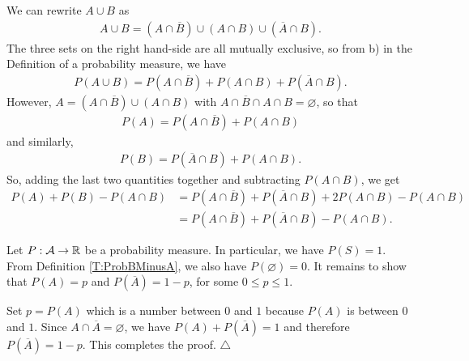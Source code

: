 	\begin{problem}
	We can rewrite $A \cup B$ as
		\begin{align*}
		A \cup B = (A \cap \overline{B}) \cup (A \cap B) \cup (\overline{A} \cap B ) .
		\end{align*}
	The three sets on the right hand-side are all mutually exclusive, so from b) in the Definition of a probability measure, we have
		\begin{align*}
		P (A \cup B) = P(A \cap \overline{B}) + P (A\cap B) + P (\overline{A} \cap B ) .
		\end{align*}
	However, $A = (A \cap \overline{B}) \cup (A \cap B)$ with $A \cap \overline{B} \cap A \cap B = \varnothing$, so that
		\begin{align*}
		P (A) = P (A \cap \overline{B}) + P (A \cap B)
		\end{align*}
	and similarly,
		\begin{align*}
		P (B) = P (\overline{A} \cap B) + P (A \cap B) .
		\end{align*}
	So, adding the last two quantities together and subtracting $P (A \cap B)$, we get
		\begin{align*}
		P (A) + P (B) - P (A \cap B) & = P (A \cap \overline{B}) + P (\overline{A} \cap B) + 2 P (A \cap B) - P (A \cap B) \\
		&= P (A \cap \overline{B}) + P (\overline{A} \cap B) - P (A \cap B) . \tag*{$\triangle$}
		\end{align*}		
	\end{problem}

	\begin{problem}
	Let $P : \mathcal{A} \rightarrow \mathbb{R}$ be a probability measure. In particular, we have $P (S) = 1$. From Definition \ref{T:ProbBMinusA}, we also have $P (\varnothing ) = 0$. It remains to show that $P (A) = p$ and $P (\overline{A}) = 1 - p$, for some $0 \leq p \leq 1$. 
	
	Set $p = P (A)$ which is a number between $0$ and $1$ because $P (A)$ is between $0$ and $1$. Since $A \cap \overline{A} = \varnothing$, we have $P (A) + P (\overline{A}) = 1$ and therefore $P (\overline{A}) = 1 - p$. This completes the proof. \hfill$\triangle$
	\end{problem}
	
